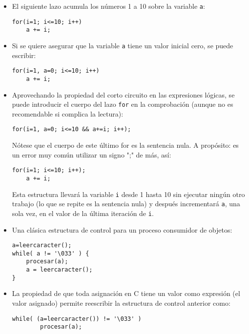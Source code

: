 \begin{ejemplo}\noindent
\begin{itemize}
	\item El siguiente lazo acumula los números 1 a 10 sobre la variable \lstinline{a}:
\begin{lstlisting}
for(i=1; i<=10; i++)
    a += i;
\end{lstlisting}

\item Si se quiere asegurar que la variable \lstinline{a} tiene un valor inicial cero, se puede
escribir:
\begin{lstlisting}
for(i=1, a=0; i<=10; i++)
	a += i;
\end{lstlisting}

\item Aprovechando la propiedad del corto circuito en las expresiones lógicas, se
puede introducir el cuerpo del lazo \lstinline{for} en la comprobación (aunque no es
recomendable si complica la lectura):

\begin{lstlisting}
for(i=1, a=0; i<=10 && a+=i; i++);
\end{lstlisting}

Nótese que el cuerpo de este último for es la sentencia nula. A propósito: es
un error muy común utilizar un signo ";" de más, así:
\begin{lstlisting}
for(i=1; i<=10; i++);
    a += i;
\end{lstlisting}

Esta estructura llevará la variable \lstinline{i} desde 1 hasta 10 sin ejecutar ningún otro
trabajo (lo que se repite es la sentencia nula) y después incrementará \lstinline{a}, una
sola vez, en el valor de la última iteración de \lstinline{i}.

\item Una clásica estructura de control para un proceso consumidor de objetos:
\begin{lstlisting}
a=leercaracter();
while( a != '\033' ) {
    procesar(a);
    a = leercaracter();
}
\end{lstlisting}

\item La propiedad de que toda asignación en C tiene un valor como expresión (el valor
asignado) permite reescribir la estructura de control anterior como:

\begin{lstlisting}
while( (a=leercaracter()) != '\033' )
        procesar(a);
\end{lstlisting}


\end{itemize}
\end{ejemplo}
